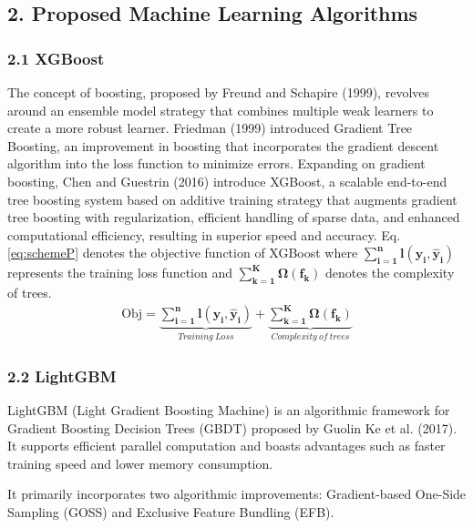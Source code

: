\documentclass[10pt,letterpaper]{article}
\begin{document}
\subsection*{2. Proposed Machine Learning Algorithms}

\subsubsection*{2.1 XGBoost}
 The concept of boosting, proposed by Freund and Schapire (1999), revolves around an ensemble model strategy that combines multiple weak learners to create a more robust learner. Friedman (1999) introduced Gradient Tree Boosting, an improvement in boosting that incorporates the gradient descent algorithm into the loss function to minimize errors. Expanding on gradient boosting, Chen and Guestrin (2016) introduce XGBoost, a scalable end-to-end tree boosting system based on additive training strategy that augments gradient tree boosting with regularization, efficient handling of sparse data, and enhanced computational efficiency, resulting in superior speed and accuracy. Eq.\ref{eq:schemeP} denotes the objective function of XGBoost where \(\mathbf{\sum_{i=1}^{n}l(y_i,\hat{y}_i)}\) represents the training loss function and \(\mathbf{{\sum_{k=1}^{K}}\Omega(f_k)}\) denotes the complexity of trees.
\begin{eqnarray}
\label{eq:schemeP}
\mathrm{Obj}=\underbrace{\mathbf{\sum_{i=1}^{n}l(y_i,\hat{y}_i)}}_{Training \: Loss} +\underbrace{\mathbf{{\sum_{k=1}^{K}}\Omega(f_k)}}_{Complexity \: of \: trees}
\end{eqnarray}

\subsubsection*{2.2 LightGBM}
LightGBM (Light Gradient Boosting Machine) is an algorithmic framework for Gradient Boosting Decision Trees (GBDT) proposed by Guolin Ke et al. (2017). It supports efficient parallel computation and boasts advantages such as faster training speed and lower memory consumption.

It primarily incorporates two algorithmic improvements: Gradient-based One-Side Sampling (GOSS) and Exclusive Feature Bundling (EFB).
\end{document}
